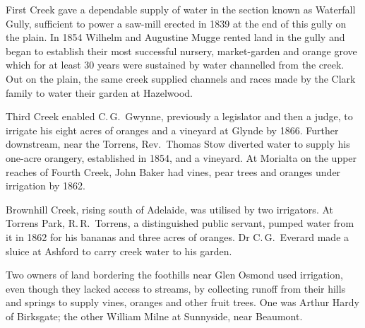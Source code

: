 First Creek  gave a dependable supply of water in
the section known as Waterfall Gully, 
sufficient to power a saw-mill  erected in
1839 at the end of this gully on the plain.  In 1854 Wilhelm and
Augustine Mugge rented  land in the gully and began
to establish their most successful nursery,
market-garden and orange grove which for
at least 30 years were sustained by water channelled from the creek.
Out on the plain, the same creek supplied
channels and races made by the Clark family
to water their garden at Hazelwood.

Third Creek  enabled C.\,G.~Gwynne,  previously a legislator and then a judge, to irrigate his
eight acres of oranges and a vineyard at
Glynde  by 1866.  Further downstream, near the
Torrens, Rev.\ Thomas Stow  diverted water to supply
his one-acre orangery,  established in 1854, and a
vineyard.  At Morialta  on the
upper reaches of Fourth Creek,  John Baker
 had vines, pear  trees and oranges
under irrigation by 1862.

Brownhill Creek,  rising south of Adelaide, was
utilised by two irrigators.  At Torrens Park, 
R.\,R.~Torrens,  a distinguished public
servant, pumped water from it in 1862 for his bananas 
and three acres of oranges.  Dr C.\,G.~Everard 
made a sluice at Ashford
 to carry creek water to his
garden.

Two owners of land bordering the foothills near Glen Osmond
 used irrigation, even though they lacked
access to streams, by collecting runoff from their hills and springs
to supply vines, oranges and other fruit
trees.  One was Arthur Hardy  of Birksgate;
 the other William Milne  at
Sunnyside, near Beaumont.

